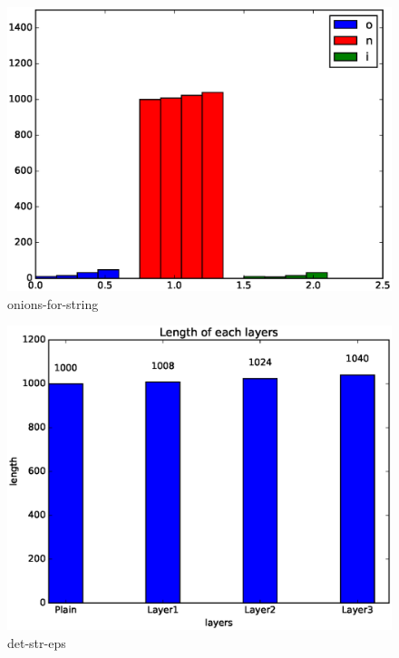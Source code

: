 
\begin{figure}[tb]
\centering
\includegraphics[width=\columnwidth]{images/onions-for-string.eps}
\caption{onions-for-string}
\label{fig:stack4}
\end{figure}


\begin{figure}[tb]
\centering
\includegraphics[width=\columnwidth]{images/det_str.eps}
\caption{det-str-eps}
\label{fig:stack5}
\end{figure}



